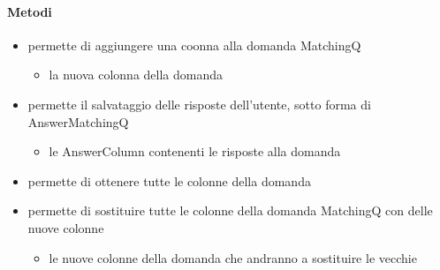 \paragraph{Metodi}
\begin{itemize}
\item {}
\newline
permette di aggiungere una coonna alla domanda MatchingQ
\newline
{}
\newline
\begin{itemize}
\item {}
\newline
la nuova colonna della domanda
\end{itemize}
\item {}
\newline
permette il salvataggio delle risposte dell'utente, sotto forma di AnswerMatchingQ
\newline
{}
\newline
\begin{itemize}
\item {}
\newline
le AnswerColumn contenenti le risposte alla domanda
\end{itemize}
\item {}
\newline
permette di ottenere tutte le colonne della domanda
\newline
\item {}
\newline
permette di sostituire tutte le colonne della domanda MatchingQ con delle nuove colonne
\newline
{}
\newline
\begin{itemize}
\item {}
\newline
le nuove colonne della domanda che andranno a sostituire le vecchie
\end{itemize}
\end{itemize}
